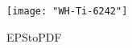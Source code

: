\begin{figure}[H]
        \texttt{[image: "WH-Ti-6242"]}
        \caption{EPStoPDF}
        \label{fig:Ti-6242 Williamson-Hall Plot}
\end{figure}